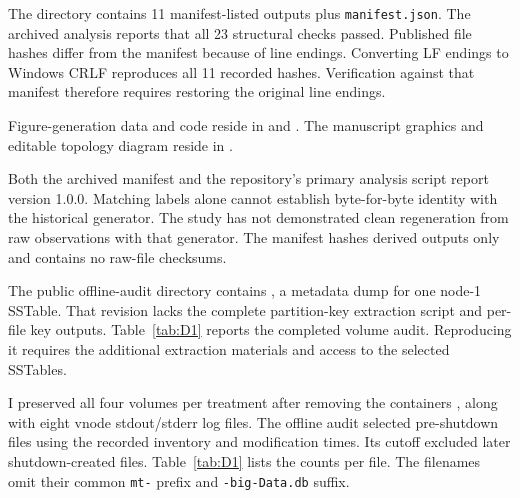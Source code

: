 The directory  contains 11 manifest-listed outputs plus \texttt{manifest.json}. The archived analysis reports that all 23 structural checks passed. Published file hashes differ from the manifest because of line endings. Converting LF endings to Windows CRLF reproduces all 11 recorded hashes. Verification against that manifest therefore requires restoring the original line endings.

Figure-generation data and code reside in  and . The manuscript graphics and editable topology diagram reside in .

Both the archived manifest and the repository's primary analysis script report version 1.0.0. Matching labels alone cannot establish byte-for-byte identity with the historical generator. The study has not demonstrated clean regeneration from raw observations with that generator. The manifest hashes derived outputs only and contains no raw-file checksums.

The public offline-audit directory contains , a metadata dump for one node-1 SSTable. That revision lacks the complete partition-key extraction script and per-file key outputs. Table~\ref{tab:D1} reports the completed volume audit. Reproducing it requires the additional extraction materials and access to the selected SSTables.

I preserved all four volumes per treatment after removing the containers \cite{r8,r9}, along with eight vnode stdout/stderr log files. The offline audit selected pre-shutdown files using the recorded inventory and modification times. Its cutoff excluded later shutdown-created files. Table~\ref{tab:D1} lists the counts per file. The filenames omit their common \texttt{mt-} prefix and \texttt{-big-Data.db} suffix.

